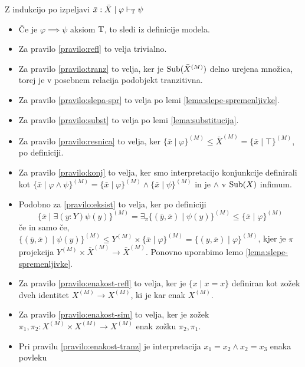 \documentclass[../kategoricna_logika.tex]{subfiles}
\begin{document}
\begin{dokaz}
  Z indukcijo po izpeljavi $\bar{x}:\bar{X} \mid \varphi \vdash_{\mathbb{T}} \psi$
  \begin{itemize}
  \item Če je $\varphi \implies \psi$ aksiom $\mathbb{T}$, to sledi iz
    definicije modela.
  \item Za pravilo \ref{pravilo:refl} to velja trivialno.
  \item Za pravilo \ref{pravilo:tranz} to velja, ker je
    $\operatorname{Sub}(\bar{X}^{(M)})$ delno urejena množica, torej je v posebnem
    relacija podobjekt tranzitivna.
  \item Za pravilo \ref{pravilo:slepa-spr} to velja po lemi
    \ref{lema:slepe-spremenljivke}.
  \item Za pravilo \ref{pravilo:subst} to velja po lemi
    \ref{lema:substitucija}.
  \item Za pravilo \ref{pravilo:resnica} to velja, ker
    $\{\bar{x} \mid \varphi\}^{(M)} \leq \bar{X}^{(M)} = \{\bar{x} \mid
    \top\}^{(M)}$, po definiciji.
  \item Za pravilo \ref{pravilo:konj} to velja, ker smo interpretacijo
    konjunkcije definirali kot
    $\{ \bar{x} \mid \varphi \land \psi\}^{(M)} = \{ \bar{x} \mid \varphi\}^{(M)}
    \land \{ \bar{x} \mid \psi\}^{(M)}$ in je $\land$ v $\operatorname{Sub}(X)$ infimum.
  \item Podobno za \ref{pravilo:eksist} to velja, ker po definiciji
    \[ \{ \bar{x} \mid \exists (y:Y) \psi(y)\}^{(M)} =
      \exists_{\pi}\{(\bar{y}, \bar{x}) \mid \psi(y)\}^{(M)} \leq
      \{\bar{x} \mid \varphi\}^{(M)}\] če in samo če,
    $\{(\bar{y},\bar{x}) \mid \psi(y)\}^{(M)} \leq
    Y^{(M)} \times \{\bar{x} \mid \varphi\}^{(M)} =
    \{(y,\bar{x}) \mid \varphi\}^{(M)}$, kjer je
    $\pi$ projekcija $Y^{(M)} \times \bar{X}^{(M)} \to \bar{X}^{(M)}$.
    Ponovno uporabimo lemo \ref{lema:slepe-spremenljivke}.
  \item Za pravilo \ref{pravilo:enakost-refl} to velja, ker je
    $\{x \mid x = x\}$ definiran kot zožek dveh identitet
    $X^{(M)} \to X^{(M)}$, ki je kar enak $X^{(M)}$.
  \item Za pravilo \ref{pravilo:enakost-sim} to velja, ker je zožek
    $\pi_1, \pi_2 : X^{(M)} \times X^{(M)} \to X^{(M)}$ enak zožku
    $\pi_2, \pi_1$.
  \item Pri pravilu \ref{pravilo:enakost-tranz} je interpretacija
    $x_1 = x_2 \land x_2 = x_3$ enaka povleku
    \begin{equation*}
      \begin{tikzcd}

\end{tikzcd}
\end{equation*}
\end{itemize}
\end{dokaz}
\end{document}
